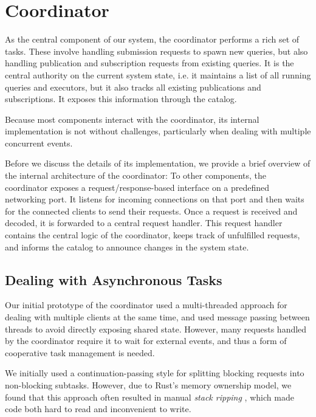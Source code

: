 
\section{Coordinator}

As the central component of our system, the coordinator performs a rich
set of tasks. These involve handling submission requests to spawn new queries,
but also handling publication and subscription requests from existing queries.
It is the central authority on the current system state, i.e. it maintains
a list of all running queries and executors, but it also tracks all existing
publications and subscriptions. It exposes this information through the catalog.

Because most components interact with the coordinator, its internal implementation
is not without challenges, particularly when dealing with multiple concurrent events.

Before we discuss the details of its implementation, we provide a
brief overview of the internal architecture of the coordinator: To other
components, the coordinator exposes a request/response-based interface on a
predefined networking port. It listens for incoming connections on that port
and then waits for the connected clients to send their requests. Once a request
is received and decoded, it is forwarded to a central request handler.
This request handler contains the central logic of the coordinator, keeps
track of unfulfilled requests, and informs the catalog to announce changes
in the system state.

\subsection{Dealing with Asynchronous Tasks}
Our initial prototype of the coordinator used a multi-threaded approach for dealing
with multiple clients at the same time, and used message passing between threads
to avoid directly exposing shared state. However, many requests handled by
the coordinator require it to wait for external events, and thus a form of
cooperative task management is needed.

We initially used a continuation-passing style for splitting blocking requests into
non-blocking subtasks. However, due to Rust's memory ownership model, we found that
this approach often resulted in manual \emph{stack ripping} \cite{stackmgmt},
which made code both hard to read and inconvenient to write.

